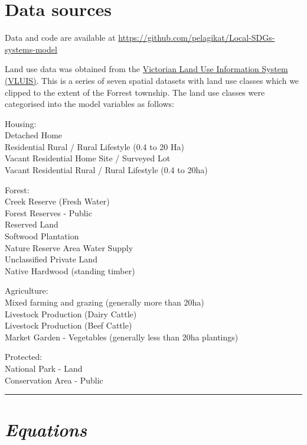 \documentclass[
  11pt,
]{book}
\begin{document}
\hypertarget{data-sources-1}{%
\section{Data sources}\label{data-sources-1}}

Data and code are available at \url{https://github.com/pelagikat/Local-SDGs-systems-model}

Land use data was obtained from the \href{http://vro.agriculture.vic.gov.au/dpi/vro/vrosite.nsf/pages/vluis}{Victorian Land Use Information System (VLUIS)}. This is a series of seven spatial datasets with land use classes which we clipped to the extent of the Forrest township. The land use classes were categorised into the model variables as follows:

Housing:\\
Detached Home\\
Residential Rural / Rural Lifestyle (0.4 to 20 Ha)\\
Vacant Residential Home Site / Surveyed Lot\\
Vacant Residential Rural / Rural Lifestyle (0.4 to 20ha)

Forest:\\
Creek Reserve (Fresh Water)\\
Forest Reserves - Public\\
Reserved Land\\
Softwood Plantation\\
Nature Reserve Area
Water Supply\\
Unclassified Private Land\\
Native Hardwood (standing timber)

Agriculture:\\
Mixed farming and grazing (generally more than 20ha)\\
Livestock Production (Dairy Cattle)\\
Livestock Production (Beef Cattle)\\
Market Garden - Vegetables (generally less than 20ha plantings)

Protected:\\
National Park - Land\\
Conservation Area - Public

\begin{center}\rule{0.5\linewidth}{0.5pt}\end{center}

\hypertarget{equations-1}{%
\section{\texorpdfstring{\emph{Equations}}{Equations}}\label{equations-1}}
\end{document}
